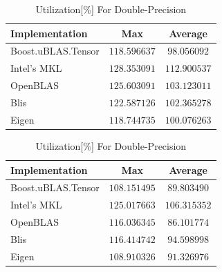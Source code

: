 \begin{table}[ht]
    \centering
    \caption{Utilization[\%] For Single-Precision}
    \begin{tabular}{|l|c|c|}
        \hline
        \textbf{Implementation} & \textbf{Max} & \textbf{Average}\\
        \hline
        Boost.uBLAS.Tensor  & $118.596637$& $98.056092$ \\
        \hline
        Intel's MKL         & $128.353091$& $112.900537$ \\
        \hline
        OpenBLAS            & $125.603091$& $103.123011$ \\
        \hline
        Blis                & $122.587126$& $102.365278$ \\
        \hline
        Eigen               & $118.744735$& $100.076263$ \\
        \hline
    \end{tabular}

    \vspace*{1 cm}

    \centering
    \caption{Utilization[\%] For Double-Precision}
    \begin{tabular}{|l|c|c|}
        \hline
        \textbf{Implementation} & \textbf{Max} & \textbf{Average}\\
        \hline
        Boost.uBLAS.Tensor  & $108.151495$& $89.803490$ \\
        \hline
        Intel's MKL         & $125.017663$& $106.315352$ \\
        \hline
        OpenBLAS            & $116.036345$& $86.101774$ \\
        \hline
        Blis                & $116.414742$& $94.598998$ \\
        \hline
        Eigen               & $108.910326$& $91.326976$ \\
        \hline
    \end{tabular}
\end{table}

